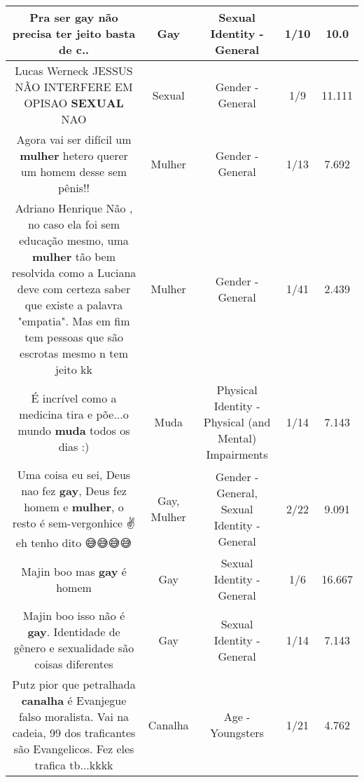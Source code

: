 \documentclass[11pt]{article}
\newlength\mylength
\begin{document}
\begin{center}
\begin{longtable}{|C{.65\mylength}|C{.30\mylength}|C{.12\mylength}|C{.12\mylength}|C{.12\mylength}|}
  \small Pra ser \textbf{gay} não precisa ter jeito basta de c..\normalsize   & Gay & Sexual Identity - General & 1/10 & 10.0 \\  \hline
  \small Lucas Werneck JESSUS NÃO INTERFERE EM OPISAO \textbf{SEXUAL} NAO\normalsize   & Sexual & Gender - General & 1/9 & 11.111 \\  \hline
  \small Agora vai ser difícil um \textbf{mulher} hetero querer um homem desse sem pênis!!\normalsize   & Mulher & Gender - General & 1/13 & 7.692 \\  \hline
  \small Adriano Henrique Não , no caso ela foi sem educação mesmo, uma \textbf{mulher} tão bem resolvida como a Luciana deve com certeza saber que existe a palavra "empatia". Mas em fim tem pessoas que são escrotas mesmo n tem jeito kk\normalsize   & Mulher & Gender - General & 1/41 & 2.439 \\  \hline
  \small É incrível como a medicina tira e põe...o mundo \textbf{muda} todos os dias :)\normalsize   & Muda & Physical Identity - Physical (and Mental) Impairments & 1/14 & 7.143 \\  \hline
  \small Uma coisa eu sei, Deus nao fez \textbf{gay}, Deus fez homem e \textbf{mulher}, o resto é sem-vergonhice ✌ eh tenho dito 😅😅😅😅\normalsize   & Gay, Mulher & Gender - General, Sexual Identity - General & 2/22 & 9.091 \\  \hline
  \small Majin boo mas \textbf{gay} é homem\normalsize   & Gay & Sexual Identity - General & 1/6 & 16.667 \\  \hline
  \small Majin boo isso não é \textbf{gay}. Identidade de gênero e sexualidade são coisas diferentes\normalsize   & Gay & Sexual Identity - General & 1/14 & 7.143 \\  \hline
  \small Putz pior que petralhada \textbf{canalha} é Evanjegue falso moralista. Vai na cadeia, 99 dos traficantes são Evangelicos. Fez eles trafica tb...kkkk\normalsize   & Canalha & Age - Youngsters & 1/21 & 4.762 \\  \hline

\end{longtable}
\end{center}
\end{document}

